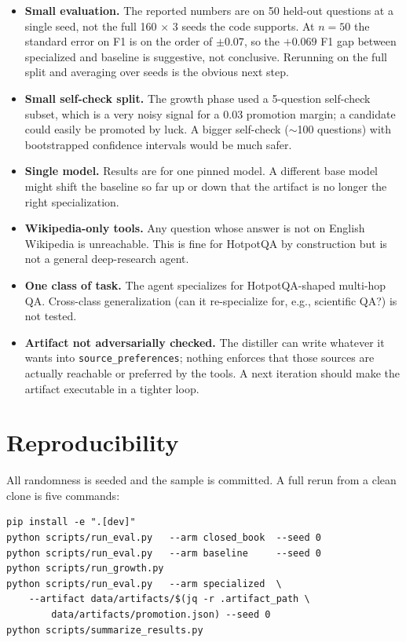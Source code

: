 \documentclass[11pt,a4paper]{article}
\begin{document}
\begin{itemize}[leftmargin=*]
    \item \textbf{Small evaluation.} The reported numbers are on 50
          held-out questions at a single seed, not the full 160 $\times$
          3 seeds the code supports. At $n = 50$ the standard error on
          F1 is on the order of $\pm 0.07$, so the $+0.069$ F1 gap
          between specialized and baseline is suggestive, not
          conclusive. Rerunning on the full split and averaging over
          seeds is the obvious next step.
    \item \textbf{Small self-check split.} The growth phase used a
          5-question self-check subset, which is a very noisy signal
          for a 0.03 promotion margin; a candidate could easily be
          promoted by luck. A bigger self-check ($\sim$100 questions)
          with bootstrapped confidence intervals would be much safer.
    \item \textbf{Single model.} Results are for one pinned model. A
          different base model might shift the baseline so far up or
          down that the artifact is no longer the right specialization.
    \item \textbf{Wikipedia-only tools.} Any question whose answer is not
          on English Wikipedia is unreachable. This is fine for HotpotQA
          by construction but is not a general deep-research agent.
    \item \textbf{One class of task.} The agent specializes for
          HotpotQA-shaped multi-hop QA. Cross-class generalization (can
          it re-specialize for, e.g., scientific QA?) is not tested.
    \item \textbf{Artifact not adversarially checked.} The distiller can
          write whatever it wants into \texttt{source\_preferences};
          nothing enforces that those sources are actually reachable or
          preferred by the tools. A next iteration should make the
          artifact executable in a tighter loop.
\end{itemize}

\section{Reproducibility}

All randomness is seeded and the sample is committed. A full rerun from
a clean clone is five commands:

\begin{lstlisting}
pip install -e ".[dev]"
python scripts/run_eval.py   --arm closed_book  --seed 0
python scripts/run_eval.py   --arm baseline     --seed 0
python scripts/run_growth.py
python scripts/run_eval.py   --arm specialized  \
    --artifact data/artifacts/$(jq -r .artifact_path \
        data/artifacts/promotion.json) --seed 0
python scripts/summarize_results.py
\end{lstlisting}
\end{document}
